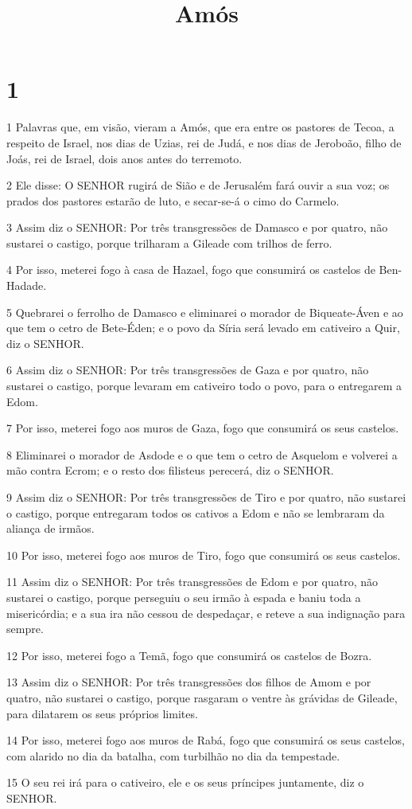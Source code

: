 

\title{Amós}


\chapter{1}

\par 1 Palavras que, em visão, vieram a Amós, que era entre os pastores de Tecoa, a respeito de Israel, nos dias de Uzias, rei de Judá, e nos dias de Jeroboão, filho de Joás, rei de Israel, dois anos antes do terremoto.
\par 2 Ele disse: O SENHOR rugirá de Sião e de Jerusalém fará ouvir a sua voz; os prados dos pastores estarão de luto, e secar-se-á o cimo do Carmelo.
\par 3 Assim diz o SENHOR: Por três transgressões de Damasco e por quatro, não sustarei o castigo, porque trilharam a Gileade com trilhos de ferro.
\par 4 Por isso, meterei fogo à casa de Hazael, fogo que consumirá os castelos de Ben-Hadade.
\par 5 Quebrarei o ferrolho de Damasco e eliminarei o morador de Biqueate-Áven e ao que tem o cetro de Bete-Éden; e o povo da Síria será levado em cativeiro a Quir, diz o SENHOR.
\par 6 Assim diz o SENHOR: Por três transgressões de Gaza e por quatro, não sustarei o castigo, porque levaram em cativeiro todo o povo, para o entregarem a Edom.
\par 7 Por isso, meterei fogo aos muros de Gaza, fogo que consumirá os seus castelos.
\par 8 Eliminarei o morador de Asdode e o que tem o cetro de Asquelom e volverei a mão contra Ecrom; e o resto dos filisteus perecerá, diz o SENHOR.
\par 9 Assim diz o SENHOR: Por três transgressões de Tiro e por quatro, não sustarei o castigo, porque entregaram todos os cativos a Edom e não se lembraram da aliança de irmãos.
\par 10 Por isso, meterei fogo aos muros de Tiro, fogo que consumirá os seus castelos.
\par 11 Assim diz o SENHOR: Por três transgressões de Edom e por quatro, não sustarei o castigo, porque perseguiu o seu irmão à espada e baniu toda a misericórdia; e a sua ira não cessou de despedaçar, e reteve a sua indignação para sempre.
\par 12 Por isso, meterei fogo a Temã, fogo que consumirá os castelos de Bozra.
\par 13 Assim diz o SENHOR: Por três transgressões dos filhos de Amom e por quatro, não sustarei o castigo, porque rasgaram o ventre às grávidas de Gileade, para dilatarem os seus próprios limites.
\par 14 Por isso, meterei fogo aos muros de Rabá, fogo que consumirá os seus castelos, com alarido no dia da batalha, com turbilhão no dia da tempestade.
\par 15 O seu rei irá para o cativeiro, ele e os seus príncipes juntamente, diz o SENHOR.

